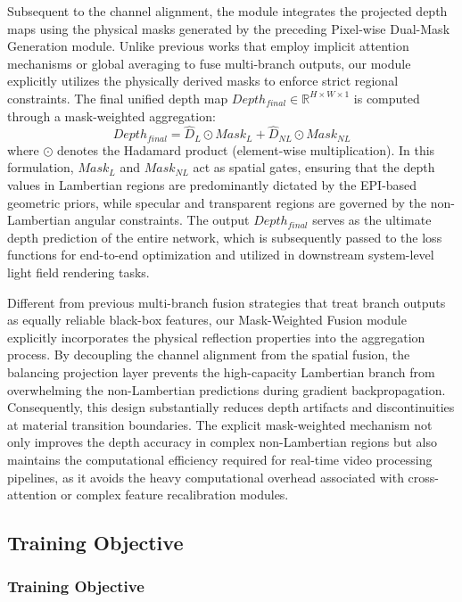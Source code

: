 \documentclass[lettersize,journal]{IEEEtran}
\begin{document}
Subsequent to the channel alignment, the module integrates the projected depth maps using the physical masks generated by the preceding Pixel-wise Dual-Mask Generation module. Unlike previous works that employ implicit attention mechanisms or global averaging to fuse multi-branch outputs, our module explicitly utilizes the physically derived masks to enforce strict regional constraints. The final unified depth map $Depth_{final} \in \mathbb{R}^{H \times W \times 1}$ is computed through a mask-weighted aggregation:
\begin{equation}
Depth_{final} = \hat{D}_L \odot Mask_L + \hat{D}_{NL} \odot Mask_{NL}
\end{equation}
where $\odot$ denotes the Hadamard product (element-wise multiplication). In this formulation, $Mask_L$ and $Mask_{NL}$ act as spatial gates, ensuring that the depth values in Lambertian regions are predominantly dictated by the EPI-based geometric priors, while specular and transparent regions are governed by the non-Lambertian angular constraints. The output $Depth_{final}$ serves as the ultimate depth prediction of the entire network, which is subsequently passed to the loss functions for end-to-end optimization and utilized in downstream system-level light field rendering tasks.

Different from previous multi-branch fusion strategies that treat branch outputs as equally reliable black-box features, our Mask-Weighted Fusion module explicitly incorporates the physical reflection properties into the aggregation process. By decoupling the channel alignment from the spatial fusion, the balancing projection layer prevents the high-capacity Lambertian branch from overwhelming the non-Lambertian predictions during gradient backpropagation. Consequently, this design substantially reduces depth artifacts and discontinuities at material transition boundaries. The explicit mask-weighted mechanism not only improves the depth accuracy in complex non-Lambertian regions but also maintains the computational efficiency required for real-time video processing pipelines, as it avoids the heavy computational overhead associated with cross-attention or complex feature recalibration modules.

\subsection{Training Objective}

\subsubsection{Training Objective}
\end{document}
